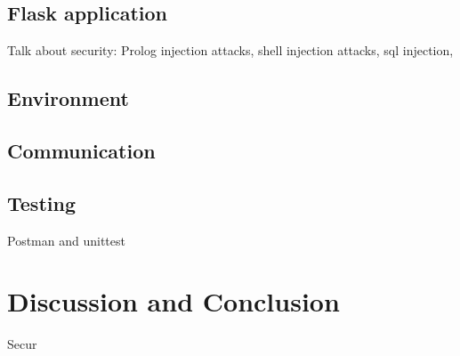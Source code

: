 \documentclass[twoside,twocolumn]{article}
\begin{document}
\subsection{Flask application}
Talk about security: Prolog injection attacks, shell injection attacks, sql injection, 


\subsection{Environment}

\subsection{Communication}

\subsection{Testing}
Postman and unittest



\section{Discussion and Conclusion}
Secur



{}


\end{document}
